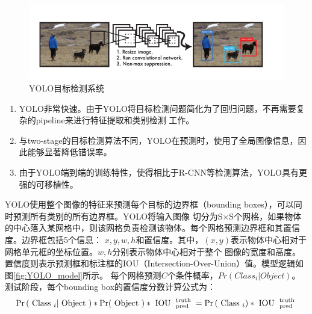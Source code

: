 \begin{figure}[htbp]
    \centering
    \includegraphics[scale=0.8]{pic/chap3/YOLO_total.jpg}
    \caption{YOLO目标检测系统}
    \label{fig:YOLO_total}
\end{figure}

\begin{enumerate}
    \item{YOLO非常快速。由于YOLO将目标检测问题简化为了回归问题，不再需要复杂的pipeline来进行特征提取和类别检测
    工作。}
    \item{与two-stage的目标检测算法不同，YOLO在预测时，使用了全局图像信息，因此能够显著降低错误率。}
    \item{由于YOLO端到端的训练特性，使得相比于R-CNN等检测算法，YOLO具有更强的可移植性。}
\end{enumerate}

YOLO使用整个图像的特征来预测每个目标的边界框（bounding boxes），可以同时预测所有类别的所有边界框。YOLO将输入图像
切分为S×S个网格，如果物体的中心落入某网格中，则该网格负责检测该物体。每个网格预测边界框和其置信度。边界框包括5个信息：
$x , y , w , h$和置信度。其中，$(x,y)$表示物体中心相对于网格单元框的坐标位置。$w,h$分别表示物体中心相对于整个
图像的宽度和高度。置信度则表示预测框和标注框的IOU（Intersection-Over-Union）值。模型逻辑如图\ref{fig:YOLO_model}所示。
每个网格预测$C$个条件概率，$Pr(Class_i|Object)$。
测试阶段，每个bounding box的置信度分数计算公式为：
\begin{equation}
    \centering
    \operatorname { Pr } \left( \text { Class } _ { i } | \text { Object } \right) * \operatorname { Pr } ( \text { Object } ) * \text { IOU } _ { \text { pred } } ^ { \text { truth } } = \operatorname { Pr } \left( \text { Class } _ { i } \right) * \text { IOU } _ { \text { pred } } ^ { \text { truth } }
    \label{YOLO_c}
\end{equation}

